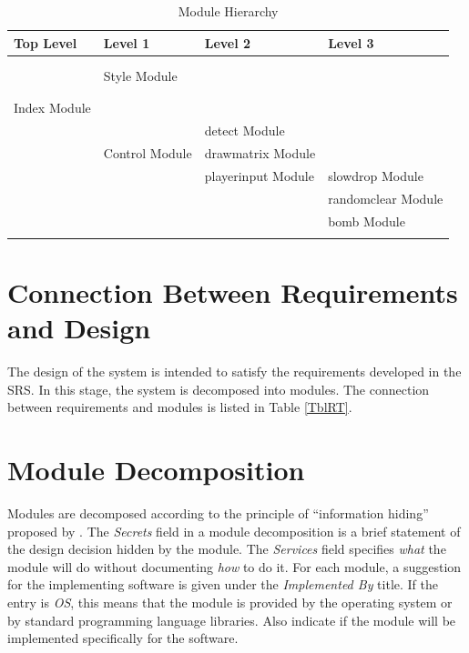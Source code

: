 \documentclass[12pt, titlepage]{article}
\begin{document}
\begin{table}[h!]
\centering
\begin{tabular}{p{} p{}  p{}   p{}}
\toprule
\textbf{Top Level} & \textbf{Level 1} & \textbf{Level 2} & \textbf{Level 3} \\
\midrule

		&		&			&\\
		&		&			&\\
		&	Style Module	&			&\\
		&		&			&\\
		&		&			&\\
Index Module	&		&			&\\
		&		&				detect Module		&\\
		&		Control Module&	drawmatrix Module		&\\
		&		&				playerinput Module		&     slowdrop Module\\
		&		&						&	randomclear Module\\
		&		&			&bomb Module			\\
		&		&			&\\

\bottomrule
\end{tabular}

\caption{Module Hierarchy}
\label{TblMH}
\end{table}


\section{Connection Between Requirements and Design} \label{SecConnection}

The design of the system is intended to satisfy the requirements developed in
the SRS. In this stage, the system is decomposed into modules. The connection
between requirements and modules is listed in Table \ref{TblRT}.

\section{Module Decomposition} \label{SecMD}

Modules are decomposed according to the principle of ``information hiding''
proposed by \citet{ParnasEtAl1984}. The \emph{Secrets} field in a module
decomposition is a brief statement of the design decision hidden by the
module. The \emph{Services} field specifies \emph{what} the module will do
without documenting \emph{how} to do it. For each module, a suggestion for the
implementing software is given under the \emph{Implemented By} title. If the
entry is \emph{OS}, this means that the module is provided by the operating
system or by standard programming language libraries.  Also indicate if the
module will be implemented specifically for the software.
\end{document}
